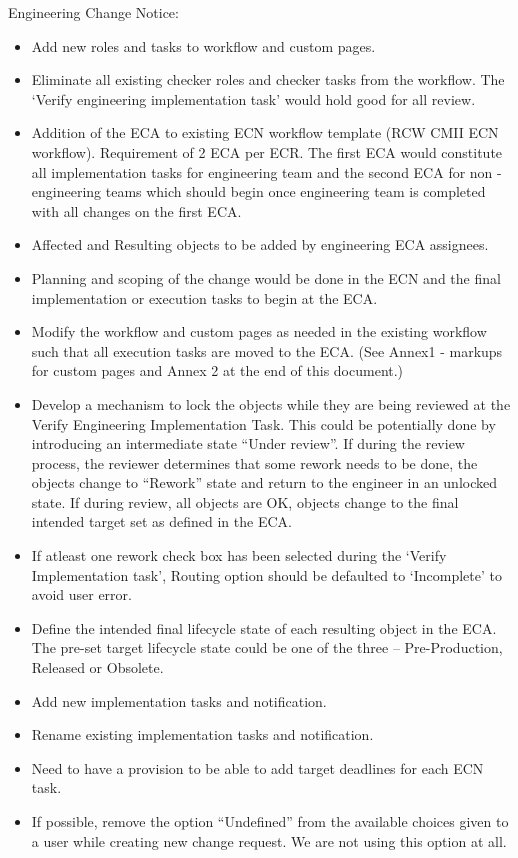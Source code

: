 Engineering Change Notice:
\begin{itemize}
	\item Add new roles and tasks to workflow and custom pages.
	\item Eliminate all existing checker roles and checker tasks from the workflow. The ‘Verify engineering implementation task’ would hold good for all review.
	\item Addition of the ECA to existing ECN workflow template (RCW CMII ECN workflow). Requirement of 2 ECA per ECR. The first ECA would constitute all implementation tasks for engineering team and the second ECA for non -engineering teams which should begin once engineering team is completed with all changes on the first ECA.
	\item Affected and Resulting objects to be added by engineering ECA assignees.
	\item Planning and scoping of the change would be done in the ECN and the final implementation or execution tasks to begin at the ECA.
	\item Modify the workflow and custom pages as needed in the existing workflow such that all execution tasks are moved to the ECA. (See Annex1 - markups for custom pages and Annex 2 at the end of this document.)
	\item Develop a mechanism to lock the objects while they are being reviewed at the Verify Engineering Implementation Task. This could be potentially done by introducing an intermediate state “Under review”. If during the review process, the reviewer determines that some rework needs to be done, the objects change to “Rework” state and return to the engineer in an unlocked state. If during review, all objects are OK, objects change to the final intended target set as defined in the ECA.
	\item If atleast one rework check box has been selected during the ‘Verify Implementation task’, Routing option should be defaulted to ‘Incomplete’ to avoid user error.
	\item Define the intended final lifecycle state of each resulting object in the ECA. The pre-set target lifecycle state could be one of the three – Pre-Production, Released or Obsolete.
	\item Add new implementation tasks and notification.
	\item Rename existing implementation tasks and notification.
	\item Need to have a provision to be able to add target deadlines for each ECN task.
	\item If possible, remove the option “Undefined” from the available choices given to a user while creating new change request. We are not using this option at all.
\end{itemize}
